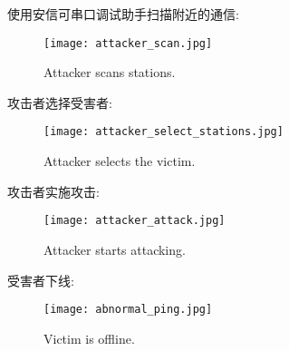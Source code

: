 \documentclass[../main.tex]{subfiles}
\begin{document}
使用安信可串口调试助手扫描附近的通信:
\begin{figure}[H]
  \begin{center}
    \texttt{[image: attacker\_scan.jpg]}
  \end{center}
  \caption{Attacker scans stations.}
\end{figure}

攻击者选择受害者:
\begin{figure}[H]
  \begin{center}
    \texttt{[image: attacker\_select\_stations.jpg]}
  \end{center}
  \caption{Attacker selects the victim.}
\end{figure}

攻击者实施攻击:
\begin{figure}[H]
  \begin{center}
    \texttt{[image: attacker\_attack.jpg]}
  \end{center}
  \caption{Attacker starts attacking.}
\end{figure}

受害者下线:
\begin{figure}[H]
  \begin{center}
    \texttt{[image: abnormal\_ping.jpg]}
  \end{center}
  \caption{Victim is offline.}
\end{figure}
%
\end{document}
